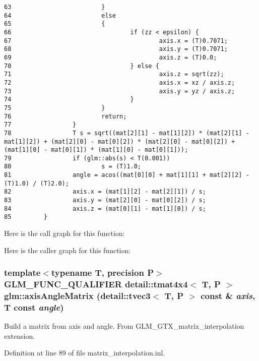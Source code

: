 \begin{Code}
\begin{verbatim}
63                         }
64                         else
65                         {
66                                 if (zz < epsilon) {
67                                         axis.x = (T)0.7071;
68                                         axis.y = (T)0.7071;
69                                         axis.z = (T)0.0;
70                                 } else {
71                                         axis.z = sqrt(zz);
72                                         axis.x = xz / axis.z;
73                                         axis.y = yz / axis.z;
74                                 }
75                         }
76                         return;
77                 }
78                 T s = sqrt((mat[2][1] - mat[1][2]) * (mat[2][1] - mat[1][2]) + (mat[2][0] - mat[0][2]) * (mat[2][0] - mat[0][2]) + (mat[1][0] - mat[0][1]) * (mat[1][0] - mat[0][1]));
79                 if (glm::abs(s) < T(0.001))
80                         s = (T)1.0;
81                 angle = acos((mat[0][0] + mat[1][1] + mat[2][2] - (T)1.0) / (T)2.0);
82                 axis.x = (mat[1][2] - mat[2][1]) / s;
83                 axis.y = (mat[2][0] - mat[0][2]) / s;
84                 axis.z = (mat[0][1] - mat[1][0]) / s;
85         }
\end{verbatim}
\end{Code}




Here is the call graph for this function:

Here is the caller graph for this function:\hypertarget{group__gtx__matrix__interpolation_gf7c0106d03d55a7b670a6261b107f22b}{
\subsubsection[axisAngleMatrix]{\setlength{\rightskip}{0pt plus 5cm}template$<$typename T, precision P$>$ GLM\_\-FUNC\_\-QUALIFIER detail::tmat4x4$<$ T, P $>$ glm::axisAngleMatrix (detail::tvec3$<$ T, P $>$ const \& {\em axis}, \/  T const  {\em angle})}}
\label{group__gtx__matrix__interpolation_gf7c0106d03d55a7b670a6261b107f22b}


Build a matrix from axis and angle. From GLM\_\-GTX\_\-matrix\_\-interpolation extension. 

Definition at line 89 of file matrix\_\-interpolation.inl.

